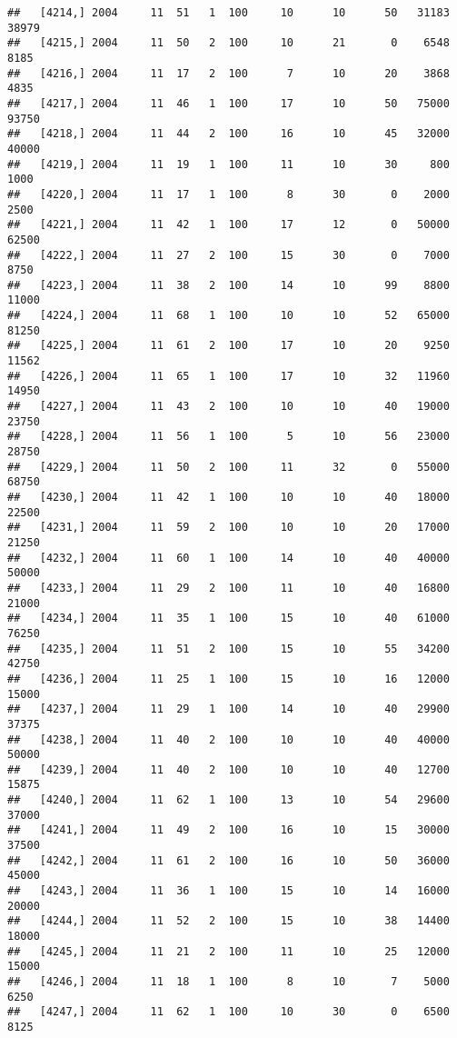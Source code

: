 \documentclass{article}\usepackage[]{graphicx}\usepackage[]{color}
\makeatletter
\newenvironment{kframe}{%
 \def\at@end@of@kframe{}%
 \ifinner\ifhmode%
  \def\at@end@of@kframe{\end{minipage}}%
  \begin{minipage}{\columnwidth}%
 \fi\fi%
 \def\FrameCommand##1{\hskip\@totalleftmargin \hskip-\fboxsep
 \colorbox{shadecolor}{##1}\hskip-\fboxsep
     \hskip-\linewidth \hskip-\@totalleftmargin \hskip\columnwidth}%
 \MakeFramed {\advance\hsize-\width
   \@totalleftmargin\z@ \linewidth\hsize
   \@setminipage}}%
 {\par\unskip\endMakeFramed%
 \at@end@of@kframe}
\newenvironment{knitrout}{}{} %
\makeatother
\begin{document}
\begin{knitrout}
\begin{kframe}
\begin{verbatim}
##   [4214,] 2004     11  51   1  100     10      10      50   31183   38979
##   [4215,] 2004     11  50   2  100     10      21       0    6548    8185
##   [4216,] 2004     11  17   2  100      7      10      20    3868    4835
##   [4217,] 2004     11  46   1  100     17      10      50   75000   93750
##   [4218,] 2004     11  44   2  100     16      10      45   32000   40000
##   [4219,] 2004     11  19   1  100     11      10      30     800    1000
##   [4220,] 2004     11  17   1  100      8      30       0    2000    2500
##   [4221,] 2004     11  42   1  100     17      12       0   50000   62500
##   [4222,] 2004     11  27   2  100     15      30       0    7000    8750
##   [4223,] 2004     11  38   2  100     14      10      99    8800   11000
##   [4224,] 2004     11  68   1  100     10      10      52   65000   81250
##   [4225,] 2004     11  61   2  100     17      10      20    9250   11562
##   [4226,] 2004     11  65   1  100     17      10      32   11960   14950
##   [4227,] 2004     11  43   2  100     10      10      40   19000   23750
##   [4228,] 2004     11  56   1  100      5      10      56   23000   28750
##   [4229,] 2004     11  50   2  100     11      32       0   55000   68750
##   [4230,] 2004     11  42   1  100     10      10      40   18000   22500
##   [4231,] 2004     11  59   2  100     10      10      20   17000   21250
##   [4232,] 2004     11  60   1  100     14      10      40   40000   50000
##   [4233,] 2004     11  29   2  100     11      10      40   16800   21000
##   [4234,] 2004     11  35   1  100     15      10      40   61000   76250
##   [4235,] 2004     11  51   2  100     15      10      55   34200   42750
##   [4236,] 2004     11  25   1  100     15      10      16   12000   15000
##   [4237,] 2004     11  29   1  100     14      10      40   29900   37375
##   [4238,] 2004     11  40   2  100     10      10      40   40000   50000
##   [4239,] 2004     11  40   2  100     10      10      40   12700   15875
##   [4240,] 2004     11  62   1  100     13      10      54   29600   37000
##   [4241,] 2004     11  49   2  100     16      10      15   30000   37500
##   [4242,] 2004     11  61   2  100     16      10      50   36000   45000
##   [4243,] 2004     11  36   1  100     15      10      14   16000   20000
##   [4244,] 2004     11  52   2  100     15      10      38   14400   18000
##   [4245,] 2004     11  21   2  100     11      10      25   12000   15000
##   [4246,] 2004     11  18   1  100      8      10       7    5000    6250
##   [4247,] 2004     11  62   1  100     10      30       0    6500    8125

\end{verbatim}
\end{kframe}
\end{knitrout}
\end{document}

